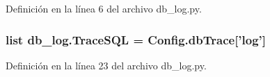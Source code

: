 Definición en la línea 6 del archivo db\-\_\-log.\-py.

\hypertarget{namespacedb__log_ad132a586866e641593afdf5e56e1e8f7}{
\subsubsection[{Trace\-S\-Q\-L}]{\setlength{\rightskip}{0pt plus 5cm}list db\-\_\-log.\-Trace\-S\-Q\-L = {\bf Config.\-db\-Trace}\mbox{[}'log'\mbox{]}}}\label{namespacedb__log_ad132a586866e641593afdf5e56e1e8f7}


Definición en la línea 23 del archivo db\-\_\-log.\-py.

